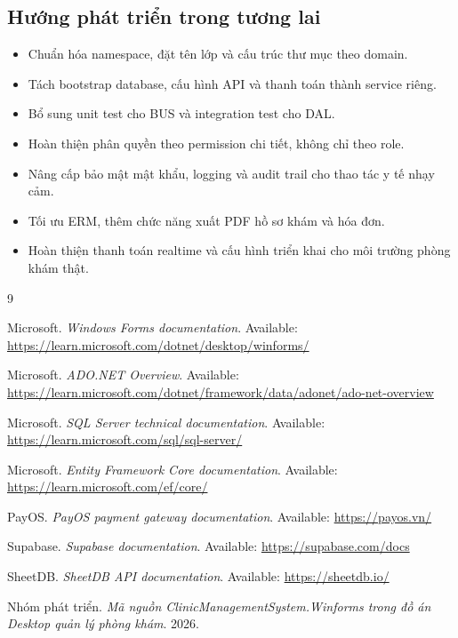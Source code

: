 \documentclass[12pt,a4paper]{article}
\numberwithin{figure}{subsection}
\numberwithin{table}{subsection}
\renewcommand{\refname}{Tài liệu tham khảo}
\begin{document}
\subsection{Hướng phát triển trong tương lai}

\begin{itemize}
    \item Chuẩn hóa namespace, đặt tên lớp và cấu trúc thư mục theo domain.
    \item Tách bootstrap database, cấu hình API và thanh toán thành service riêng.
    \item Bổ sung unit test cho BUS và integration test cho DAL.
    \item Hoàn thiện phân quyền theo permission chi tiết, không chỉ theo role.
    \item Nâng cấp bảo mật mật khẩu, logging và audit trail cho thao tác y tế nhạy cảm.
    \item Tối ưu ERM, thêm chức năng xuất PDF hồ sơ khám và hóa đơn.
    \item Hoàn thiện thanh toán realtime và cấu hình triển khai cho môi trường phòng khám thật.
\end{itemize}

\newpage
{}
\renewcommand{\refname}{Tài liệu tham khảo}
\begin{thebibliography}{9}

Microsoft. \textit{Windows Forms documentation}. Available: \url{https://learn.microsoft.com/dotnet/desktop/winforms/}

Microsoft. \textit{ADO.NET Overview}. Available: \url{https://learn.microsoft.com/dotnet/framework/data/adonet/ado-net-overview}

Microsoft. \textit{SQL Server technical documentation}. Available: \url{https://learn.microsoft.com/sql/sql-server/}

Microsoft. \textit{Entity Framework Core documentation}. Available: \url{https://learn.microsoft.com/ef/core/}

PayOS. \textit{PayOS payment gateway documentation}. Available: \url{https://payos.vn/}

Supabase. \textit{Supabase documentation}. Available: \url{https://supabase.com/docs}

SheetDB. \textit{SheetDB API documentation}. Available: \url{https://sheetdb.io/}

Nhóm phát triển. \textit{Mã nguồn ClinicManagementSystem.Winforms trong đồ án Desktop quản lý phòng khám}. 2026.

\end{thebibliography}
\end{document}
